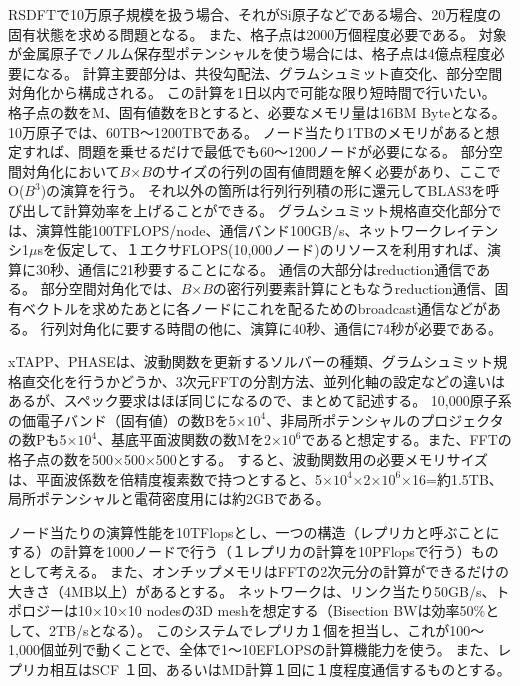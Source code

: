
RSDFTで10万原子規模を扱う場合、それがSi原子などである場合、20万程度の固有状態を求める問題となる。
また、格子点は2000万個程度必要である。
対象が金属原子でノルム保存型ポテンシャルを使う場合には、格子点は4億点程度必要になる。
計算主要部分は、共役勾配法、グラムシュミット直交化、部分空間対角化から構成される。
この計算を1日以内で可能な限り短時間で行いたい。
格子点の数をM、固有値数をBとすると、必要なメモリ量は16BM Byteとなる。
10万原子では、60TB～1200TBである。
ノード当たり1TBのメモリがあると想定すれば、問題を乗せるだけで最低でも60～1200ノードが必要になる。
部分空間対角化において$B$×$B$のサイズの行列の固有値問題を解く必要があり、ここでO($B^3$)の演算を行う。
それ以外の箇所は行列行列積の形に還元してBLAS3を呼び出して計算効率を上げることができる。
グラムシュミット規格直交化部分では、演算性能100TFLOPS/node、通信バンド100GB/s、ネットワークレイテンシ1$\mu$sを仮定して、１エクサFLOPS(10,000ノード)のリソースを利用すれば、演算に30秒、通信に21秒要することになる。
通信の大部分はreduction通信である。
部分空間対角化では、$B$×$B$の密行列要素計算にともなうreduction通信、固有ベクトルを求めたあとに各ノードにこれを配るためのbroadcast通信などがある。
行列対角化に要する時間の他に、演算に40秒、通信に74秒が必要である。

xTAPP、PHASEは、波動関数を更新するソルバーの種類、グラムシュミット規格直交化を行うかどうか、3次元FFTの分割方法、並列化軸の設定などの違いはあるが、スペック要求はほぼ同じになるので、まとめて記述する。
10,000原子系の価電子バンド（固有値）の数Bを5×$10^4$、非局所ポテンシャルのプロジェクタの数Pも5×$10^4$、基底平面波関数の数Mを2×$10^6$であると想定する。また、FFTの格子点の数を500×500×500とする。
すると、波動関数用の必要メモリサイズは、平面波係数を倍精度複素数で持つとすると、5×$10^4$×2×$10^6$×16=約1.5TB、局所ポテンシャルと電荷密度用には約2GBである。

ノード当たりの演算性能を10TFlopsとし、一つの構造（レプリカと呼ぶことにする）の計算を1000ノードで行う（１レプリカの計算を10PFlopsで行う）ものとして考える。
また、オンチップメモリはFFTの2次元分の計算ができるだけの大きさ（4MB以上）があるとする。
ネットワークは、リンク当たり50GB/s、トポロジーは10×10×10 nodesの3D meshを想定する（Bisection BWは効率50\%として、2TB/sとなる）。
このシステムでレプリカ１個を担当し、これが100～1,000個並列で動くことで、全体で1～10EFLOPSの計算機能力を使う。
また、レプリカ相互はSCF １回、あるいはMD計算１回に１度程度通信するものとする。

